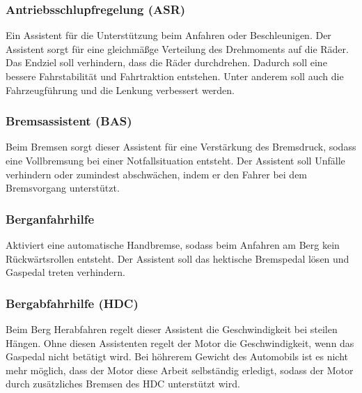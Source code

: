         \subsubsection{Antriebsschlupfregelung (ASR)}
        Ein Assistent für die Unterstützung beim Anfahren oder Beschleunigen. Der
        Assistent sorgt für eine gleichmäßge Verteilung des Drehmoments auf die Räder.
        Das Endziel soll verhindern, dass die Räder durchdrehen. Dadurch soll eine 
        bessere Fahrstabilität und Fahrtraktion entstehen. Unter anderem soll auch 
        die Fahrzeugführung und die Lenkung verbessert werden.
        ~\cite{assistenzsysteme.PB2} ~\cite{ASR.PB1} ~\cite{ASR.PB2} 

        \subsubsection{Bremsassistent (BAS)}
        Beim Bremsen sorgt dieser Assistent für eine Verstärkung des Bremsdruck, sodass
        eine Vollbremsung bei einer Notfallsituation entsteht. Der Assistent soll Unfälle 
        verhindern oder zumindest abschwächen, indem er den Fahrer bei dem Bremsvorgang 
        unterstützt.
        ~\cite{assistenzsysteme.PB2} ~\cite{bremsassi.PB1} ~\cite{bremsassi.PB2}

        \subsubsection{Berganfahrhilfe}
        Aktiviert eine automatische Handbremse, sodass beim Anfahren am Berg kein Rückwärtsrollen
        entsteht. Der Assistent soll das hektische Bremspedal lösen und Gaspedal treten 
        verhindern.
        ~\cite{berganfahr.PB1} ~\cite{berganfahr.PB2}  ~\cite{assistenzsysteme.PB2}
        
        \subsubsection{Bergabfahrhilfe (HDC)}
        Beim Berg Herabfahren regelt dieser Assistent die Geschwindigkeit bei steilen Hängen. 
        Ohne diesen Assistenten regelt der Motor die Geschwindigkeit, wenn das Gaspedal nicht 
        betätigt wird. Bei höhrerem Gewicht des Automobils ist es nicht mehr möglich, dass 
        der Motor diese Arbeit selbständig erledigt, sodass der Motor durch zusätzliches Bremsen 
        des HDC unterstützt wird.
        ~\cite{assistenzsysteme.PB2} ~\cite{bergabfahr.PB1} 

